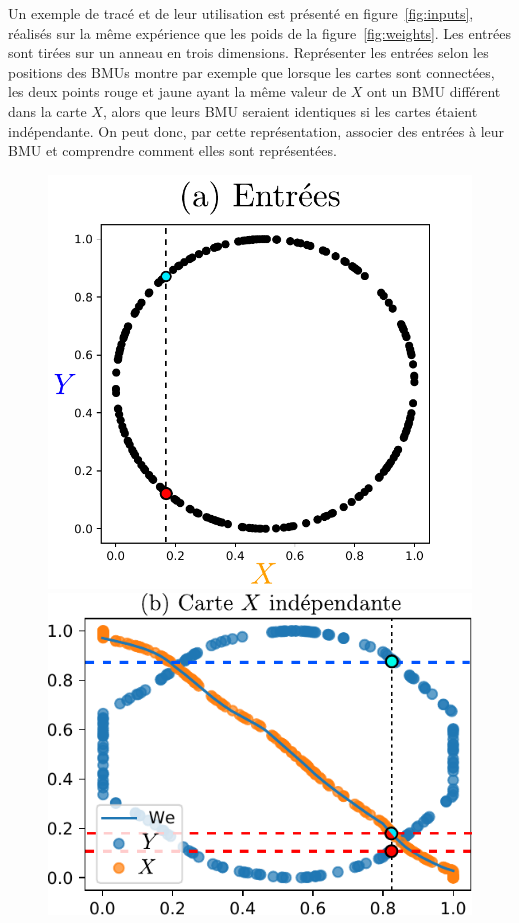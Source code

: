 Un exemple de tracé et de leur utilisation est présenté en figure~\ref{fig:inputs}, réalisés sur la même expérience que les poids de la figure~\ref{fig:weights}. Les entrées sont tirées sur un anneau en trois dimensions. Représenter les entrées selon les positions des BMUs montre par exemple que lorsque les cartes sont connectées, les deux points rouge et jaune ayant la même valeur de $X$ ont un BMU différent dans la carte $X$, alors que leurs BMU seraient identiques si les cartes étaient indépendante. On peut donc, par cette représentation, associer des entrées à leur BMU et comprendre comment elles sont représentées.

\begin{figure}
\begin{minipage}{0.27\textwidth}
\includegraphics[width=\textwidth]{2som_inp.pdf}
\end{minipage}
\begin{minipage}{0.34\textwidth}
\includegraphics[width=\textwidth]{weights_2som_unco.pdf}

\end{minipage}
\end{figure}

